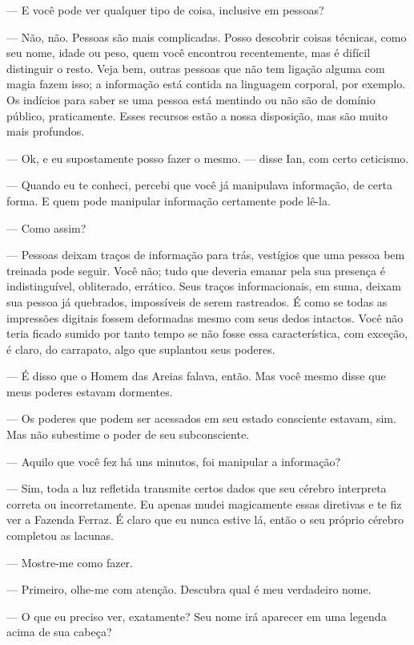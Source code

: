 --- E você pode ver qualquer tipo de coisa, inclusive em pessoas?

--- Não, não. Pessoas são mais complicadas. Posso descobrir coisas
técnicas, como seu nome, idade ou peso, quem você encontrou
recentemente, mas é difícil distinguir o resto. Veja bem, outras pessoas
que não tem ligação alguma com magia fazem isso; a informação está
contida na linguagem corporal, por exemplo. Os indícios para saber se
uma pessoa está mentindo ou não são de domínio público, praticamente.
Esses recursos estão a nossa disposição, mas são muito mais profundos.

--- Ok, e eu supostamente posso fazer o mesmo. --- disse Ian, com certo
ceticismo.

--- Quando eu te conheci, percebi que você já manipulava informação, de
certa forma. E quem pode manipular informação certamente pode lê-la.

--- Como assim?

--- Pessoas deixam traços de informação para trás, vestígios que uma
pessoa bem treinada pode seguir. Você não; tudo que deveria emanar pela
sua presença é indistinguível, obliterado, errático. Seus traços
informacionais, em suma, deixam sua pessoa já quebrados, impossíveis de
serem rastreados. É como se todas as impressões digitais fossem
deformadas mesmo com seus dedos intactos. Você não teria ficado sumido
por tanto tempo se não fosse essa característica, com exceção, é claro,
do carrapato, algo que suplantou seus poderes.

--- É disso que o Homem das Areias falava, então. Mas você mesmo disse
que meus poderes estavam dormentes.

--- Os poderes que podem ser acessados em seu estado consciente estavam,
sim. Mas não subestime o poder de seu subconsciente.

--- Aquilo que você fez há uns minutos, foi manipular a informação?

--- Sim, toda a luz refletida transmite certos dados que seu cérebro
interpreta correta ou incorretamente. Eu apenas mudei magicamente essas
diretivas e te fiz ver a Fazenda Ferraz. É claro que eu nunca estive lá,
então o seu próprio cérebro completou as lacunas.

--- Mostre-me como fazer.

--- Primeiro, olhe-me com atenção. Descubra qual é meu verdadeiro nome.

--- O que eu preciso ver, exatamente? Seu nome irá aparecer em uma
legenda acima de sua cabeça?

